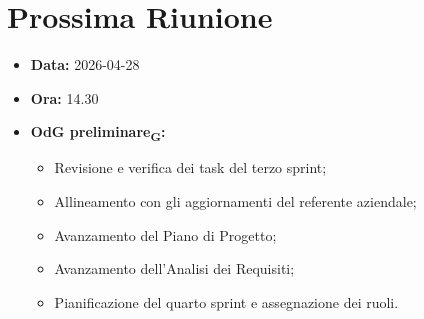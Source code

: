 \section{Prossima Riunione}
\begin{itemize}
	\item \textbf{Data:} 2026-04-28
	\item \textbf{Ora:} 14.30
	\item \textbf{OdG preliminare\textsubscript{G}:} 
	\begin{itemize}
		\item Revisione e verifica dei task del terzo sprint;
		\item Allineamento con gli aggiornamenti del referente aziendale;
		\item Avanzamento del Piano di Progetto;
		\item Avanzamento dell'Analisi dei Requisiti;
		\item Pianificazione del quarto sprint e assegnazione dei ruoli.
	\end{itemize} 
\end{itemize}